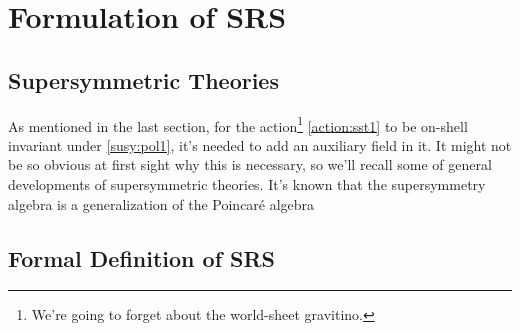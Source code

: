 \section{Formulation of SRS}
\label{sec:form}

\subsection{Supersymmetric Theories}

As mentioned in the last section, for the action\footnote{We're going to forget about the 
world-sheet gravitino.} \eqref{action:sst1} to be on-shell invariant under \eqref{susy:pol1}, 
it's needed to add an auxiliary field in it. It might not be so obvious at first sight why this is necessary, 
so we'll recall some of general developments of supersymmetric theories. It's known that the supersymmetry 
algebra is a generalization of the Poincaré algebra

\subsection{Formal Definition of SRS}